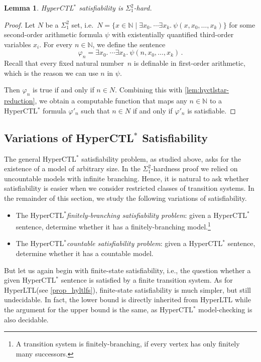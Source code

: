 \documentclass[dvipsnames,10pt,a4paper]{amsart}
\newtheorem{lem}[thm]{Lemma}
\theoremstyle{definition}
\theoremstyle{remark}
\newcommand{\set}[1]{\{#1\}}
\newcommand{\nats}{\mathbb{N}}
\renewcommand{\phi}{\varphi}
\newcommand\Nat{\nats}
\newcommand{\hyltl}{{HyperLTL}\xspace}
\newcommand{\hyctlstar}{{HyperCTL$^*$}\xspace}
\renewcommand{\phi}{\varphi}
\begin{document}
\begin{lem}
  \hyctlstar satisfiability is $\Sigma^2_1$-hard.
\end{lem}
\begin{proof}
  Let $N$ be a $\Sigma^2_1$ set, i.e.\
  $N = \set{x \in \nats \mid \exists x_0.\ \cdots \exists x_k.\ \psi(x, x_0, \ldots, x_k)}$ for some second-order arithmetic formula $\psi$ with existentially
  quantified third-order variables $x_i$.
  For every $n \in \Nat$, we define the sentence
  \[\varphi_n = \exists x_0.\ \cdots \exists x_k.\ \psi(n,x_0,\ldots,x_k)\, .\]
	Recall that every fixed natural number~$n$ is definable in first-order arithmetic, which is the reason we can use $n$ in $\psi$.
  
  Then $\varphi_n$ is true  if and only if  $n \in N$.
  Combining this with \autoref{lem:hyctlstar-reduction}, we obtain a
  computable function that maps any $n \in \Nat$ to a \hyctlstar formula
  $\phi'_n$ such that $n \in N$ if and only if $\phi'_n$ is satisfiable.
\end{proof}


\subsection{Variations of \texorpdfstring{\hyctlstar}{HyperCTL*} Satisfiability}

The general \hyctlstar satisfiability problem, as studied above, asks for the existence of a model of arbitrary size. 
In the $\Sigma^2_1$-hardness proof we relied on uncountable models with infinite branching. 
Hence, it is natural to ask whether satisfiability is easier when we consider restricted classes of transition systems.
In the remainder of this section, we study the following variations of satisfiability.

\begin{itemize}
\item The \hyctlstar \emph{finitely-branching satisfiability problem}: given a \hyctlstar sentence, determine whether it has a finitely-branching model.\footnote{A transition system is finitely-branching, if every vertex has only finitely many successors.}
\item The \hyctlstar \emph{countable satisfiability problem}: given a \hyctlstar sentence, determine whether it has a countable model.
\end{itemize}

But let us again begin with finite-state satisfiability, i.e., the question whether a given \hyctlstar sentence is satisfied by a finite transition system.
As for \hyltl (see \autoref{prop_hyltlfs}), finite-state satisfiability is much simpler, but still undecidable.
In fact, the lower bound is directly inherited from \hyltl while the argument for the upper bound is the same, as \hyctlstar model-checking is also decidable.
\end{document}
